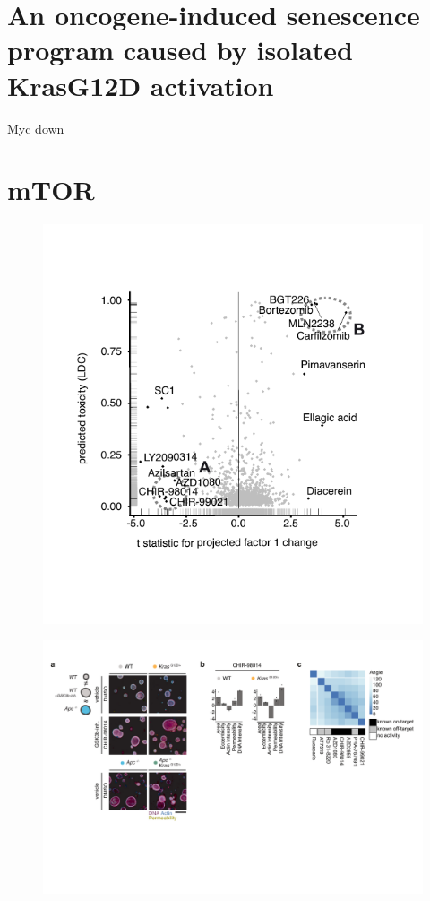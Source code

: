 \begin{flushleft}
\section{An oncogene-induced senescence program caused by isolated KrasG12D activation}
Myc down


\section{mTOR}


\begin{figure}[h]
\centering
\includegraphics[width=\textwidth,
                height=\textheight,
                keepaspectratio]{figures/adenomaprofiling/pdf/fig_2_3.pdf}
\caption{}
\label{fig_180}
\end{figure}
\bigbreak

\begin{figure}[h]
\centering
\includegraphics[width=\textwidth,
                height=\textheight,
                keepaspectratio]{figures/adenomaprofiling/pdf/fig_2_4.pdf}
\caption{}
\label{fig_180}
\end{figure}
\bigbreak


\end{flushleft}
